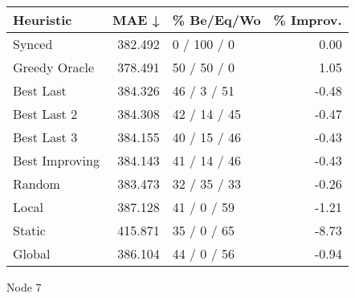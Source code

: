 \begin{tabular}{lrlr}
\toprule
\textbf{Heuristic} & \textbf{MAE ↓} & \textbf{\% Be/Eq/Wo} & \textbf{\% Improv.} \\
\midrule
            Synced &        382.492 &          0 / 100 / 0 &                0.00 \\
     Greedy Oracle &        378.491 &          50 / 50 / 0 &                1.05 \\
         Best Last &        384.326 &          46 / 3 / 51 &               -0.48 \\
       Best Last 2 &        384.308 &         42 / 14 / 45 &               -0.47 \\
       Best Last 3 &        384.155 &         40 / 15 / 46 &               -0.43 \\
    Best Improving &        384.143 &         41 / 14 / 46 &               -0.43 \\
            Random &        383.473 &         32 / 35 / 33 &               -0.26 \\
             Local &        387.128 &          41 / 0 / 59 &               -1.21 \\
            Static &        415.871 &          35 / 0 / 65 &               -8.73 \\
            Global &        386.104 &          44 / 0 / 56 &               -0.94 \\
\bottomrule
\end{tabular}
\caption{Node 7}
\label{tab:iid_lr05_le1_bs2_7}
